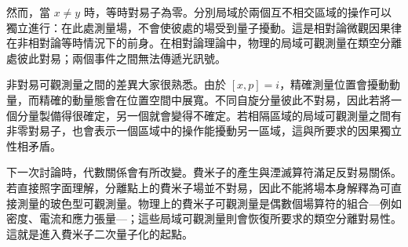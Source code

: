 \begin{classroomqa}
\end{classroomqa}

然而，當 \(x\neq y\) 時，等時對易子為零。分別局域於兩個互不相交區域的操作可以獨立進行：在此處測量場，不會使彼處的場受到量子擾動。這是相對論微觀因果律在非相對論等時情況下的前身。在相對論理論中，物理的局域可觀測量在類空分離處彼此對易；兩個事件之間無法傳遞光訊號。

非對易可觀測量之間的差異大家很熟悉。由於 \([x,p]=i\)，精確測量位置會擾動動量，而精確的動量態會在位置空間中展寬。不同自旋分量彼此不對易，因此若將一個分量製備得很確定，另一個就會變得不確定。若相隔區域的局域可觀測量之間有非零對易子，也會表示一個區域中的操作能擾動另一區域，這與所要求的因果獨立性相矛盾。

\begin{classroomqa}
\end{classroomqa}

下一次討論時，代數關係會有所改變。費米子的產生與湮滅算符滿足反對易關係。若直接照字面理解，分離點上的費米子場並不對易，因此不能將場本身解釋為可直接測量的玻色型可觀測量。物理上的費米子可觀測量是偶數個場算符的組合---例如密度、電流和應力張量---；這些局域可觀測量則會恢復所要求的類空分離對易性。這就是進入費米子二次量子化的起點。
